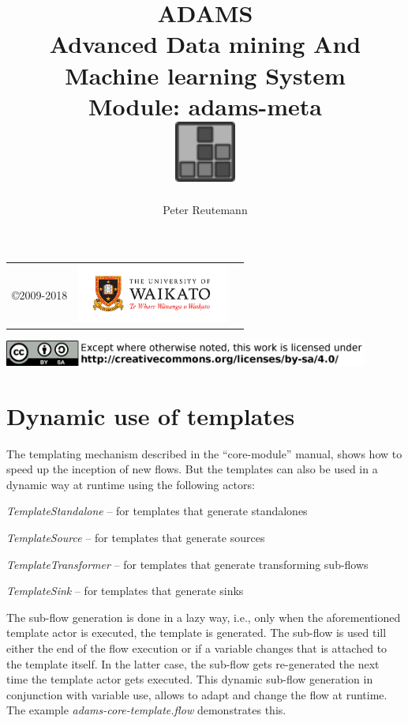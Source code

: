 \documentclass[a4paper]{book}
\title{
  \textbf{ADAMS} \\
  {\Large \textbf{A}dvanced \textbf{D}ata mining \textbf{A}nd \textbf{M}achine
  learning \textbf{S}ystem} \\
  {\Large Module: adams-meta} \\
  \vspace{1cm}
  \includegraphics[width=2cm]{images/meta-module.png} \\
}
\author{
  Peter Reutemann
}
\begin{document}
\begin{titlepage}
\maketitle

\thispagestyle{empty}
\center
\begin{table}[b]
	\begin{tabular}{c l l}
		\parbox[c][2cm]{2cm}{\copyright 2009-2018} &
		\parbox[c][2cm]{5cm}{\includegraphics[width=5cm]{images/coat_of_arms.pdf}} \\
	\end{tabular}
	\includegraphics[width=12cm]{images/cc.png} \\
\end{table}

\end{titlepage}

\tableofcontents
\listoffigures



\newpage
\chapter{Dynamic use of templates}
\label{dynamic}
The templating mechanism described in the ``core-module'' manual, shows how to 
speed up the inception of new flows. But the templates can also be used in a
dynamic way at runtime using the following actors:
\begin{tight_itemize}
	\item \textit{TemplateStandalone} -- for templates that generate standalones
	\item \textit{TemplateSource} -- for templates that generate sources
	\item \textit{TemplateTransformer} -- for templates that generate transforming
	sub-flows
	\item \textit{TemplateSink} -- for templates that generate sinks
\end{tight_itemize}
The sub-flow generation is done in a lazy way, i.e., only when the
aforementioned template actor is executed, the template is generated. The
sub-flow is used till either the end of the flow execution or if a variable
changes that is attached to the template itself. In the latter case, the
sub-flow gets re-generated the next time the template actor gets executed. This
dynamic sub-flow generation in conjunction with variable use, allows to adapt
and change the flow at runtime. The example \textit{adams-core-template.flow}
demonstrates this.
\end{document}
